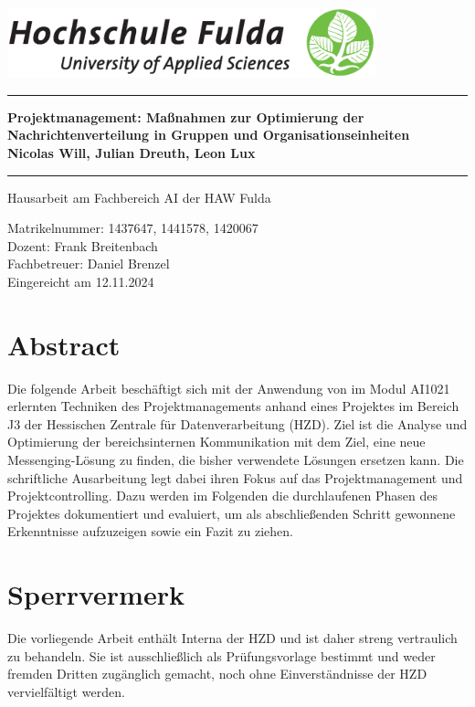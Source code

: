 \documentclass[12pt,oneside]{article}
\newcommand{\HSFTitle}[8]{

  \thispagestyle{empty}
\begin{center}
    \includegraphics[width=0.8\textwidth]{logo.eps} \\
    \vspace*{\stretch{1}}
    \end{center}

  {\parindent0cm
  \rule{\linewidth}{.7ex}}
  \begin{center}
    \vspace*{\stretch{1}}
    \sffamily\bfseries\Huge
    #1\\
    \vspace*{\stretch{1}}
    \sffamily\bfseries\large
    #3
    \vspace*{\stretch{1}}
  \end{center}
  \rule{\linewidth}{.7ex}

  \vspace*{\stretch{2}}
  \begin{center}
    \Large #2 am #5 der HAW Fulda \\
    \vspace*{\stretch{1}}

    \large Matrikelnummer:  #4 \\[1mm]
    \large Dozent:  #7 \\[1mm]
    \large Fachbetreuer:  #8 \\[1mm]

    \vspace*{\stretch{1}}
    \large Eingereicht am #6
  \end{center}
}
\begin{document}
\makeatletter
  \HSFTitle
      {Projektmanagement: Maßnahmen zur Optimierung der Nachrichtenverteilung in Gruppen und Organisationseinheiten }        %
      {Hausarbeit} %
      {Nicolas Will, Julian Dreuth, Leon Lux}          %
      {1437647, 1441578, 1420067}
      {Fachbereich AI}  %
      {12.11.2024}        %
      {Frank Breitenbach}     %
      {Daniel Brenzel}    %
  \clearpage

\lhead{}
    \setcounter{page}{1}

\clearpage
%
\section*{Abstract}

Die folgende Arbeit beschäftigt sich mit der Anwendung von im Modul AI1021 erlernten Techniken des Projektmanagements anhand eines Projektes im 
Bereich J3 der Hessischen Zentrale für Datenverarbeitung (HZD). Ziel ist die Analyse und Optimierung der bereichsinternen Kommunikation mit dem Ziel, 
eine neue Messenging-Lösung zu finden, die bisher verwendete Lösungen ersetzen kann. Die schriftliche Ausarbeitung legt dabei ihren Fokus auf 
das Projektmanagement und Projektcontrolling. Dazu werden im Folgenden die durchlaufenen Phasen des Projektes dokumentiert und evaluiert, um als 
abschließenden Schritt gewonnene Erkenntnisse aufzuzeigen sowie ein Fazit zu ziehen.

\section*{Sperrvermerk}
Die vorliegende Arbeit enthält Interna der HZD und ist daher streng vertraulich zu behandeln. Sie ist ausschließlich als Prüfungsvorlage bestimmt und weder
fremden Dritten zugänglich gemacht, noch ohne Einverständnisse der HZD vervielfältigt werden.


\clearpage
\tableofcontents
\clearpage

\listoffigures

\listoftables
\clearpage

\renewcommand{\baselinestretch}{1.2} 
\end{document}
